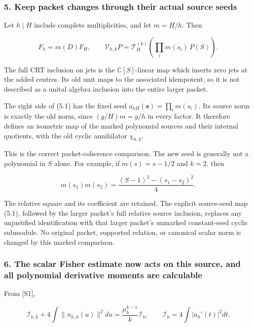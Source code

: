 \subsubsection{5. Keep packet changes through their actual source
seeds}\label{cyclic_sum:keep-packet-changes-through-their-actual-source-seeds}

Let \(h\mid H\) include complete multiplicities, and let \(m=H/h\). Then

\[F_h=m(D)F_H,\qquad
\mathcal V_{h,k}P=\mathcal T_H^{(k)}\left(\prod_i m(s_i)\,P(S)\right).\tag{5.1}\]

The full CRT inclusion on jets is the \(\mathbb C[S]\)-linear map which
inserts zero jets at the added centres. Its old unit maps to the
associated idempotent, so it is not described as a unital algebra
inclusion into the entire larger packet.

The right side of (5.1) has the fixed seed
\(a_{hH}(\mathbf s)=\prod_i m(s_i)\). Its source norm is exactly the old
norm, since \((g/H)m=g/h\) in every factor. It therefore defines an
isometric map of the marked polynomial sources and their internal
quotients, with the old cyclic annihilator \(\chi_{h,k}\).

This is the correct packet-coherence comparison. The new seed is
generally not a polynomial in \(S\) alone. For example, if
\(m(s)=s-1/2\) and \(k=2\), then

\[m(s_1)m(s_2)=\frac{(S-1)^2-(s_1-s_2)^2}{4}.\tag{5.2}\]

The relative square and its coefficient are retained. The explicit
source-seed map (5.1), followed by the larger packet's full relative
source inclusion, replaces any unjustified identification with that
larger packet's unmarked constant-seed cyclic submodule. No original
packet, supported relation, or canonical scalar norm is changed by this
marked comparison.

\subsubsection{6. The scalar Fisher estimate now acts on this source, and
all polynomial derivative moments are
calculable}\label{cyclic_sum:the-scalar-fisher-estimate-now-acts-on-this-source-and-all-polynomial-derivative-moments-are-calculable}

From {[}S1{]},

\[\mathcal I_{h,k}+4\int\|n_{h,k}(u)\|^2du
=\frac{\mu_h^{k-1}}k\mathcal I_h,
\qquad \mathcal I_h=4\int|a_h'(t)|^2dt.\tag{6.1}\]

